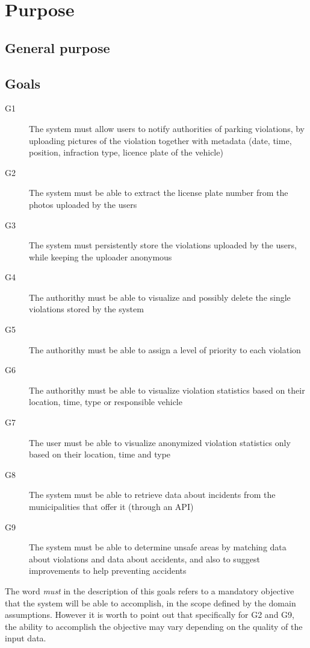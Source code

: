 \section{Purpose}

\subsection{General purpose}


\subsection{Goals}

\begin{description}
    \item[G1] The system must allow users to notify authorities of
    parking violations, by uploading pictures of the violation
    together with metadata
    (date, time, position, infraction type, licence plate of the vehicle)
    \item[G2] The system must be able to extract the license plate number
    from the photos uploaded by the users
    \item[G3] The system must persistently store the violations
    uploaded by the users, while keeping the uploader anonymous
    \item[G4] The authorithy must be able to visualize and possibly delete 
    the single violations stored by the system
    \item[G5] The authorithy must be able to assign a level of priority
    to each violation
    \item[G6] The authorithy must be able to visualize violation statistics
    based on their location, time, type or responsible vehicle
    \item[G7] The user must be able to visualize anonymized violation
    statistics only based on their location, time and type
    \item[G8] The system must be able to retrieve data about incidents
    from the municipalities that offer it (through an API)
    \item[G9] The system must be able to determine unsafe areas by
    matching data about violations and data about accidents, and also
    to suggest improvements to help preventing accidents      
\end{description}

\noindent
The word \emph{must} in the description of this goals refers to a mandatory
objective that the system will be able to accomplish, in the scope defined
by the domain assumptions.
However it is worth to point out that specifically for G2 and G9,
the ability to accomplish the objective may vary depending on the
quality of the input data.

